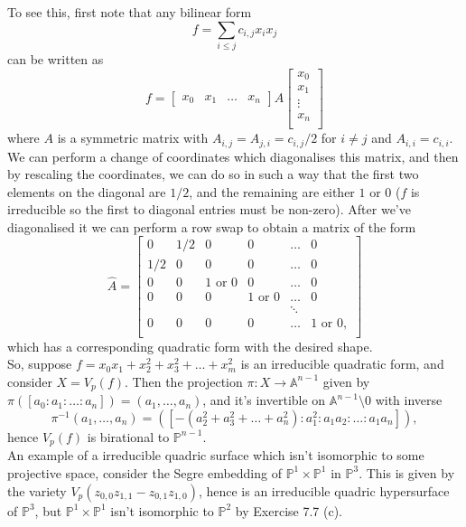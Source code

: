 \documentclass{article}
\theoremstyle{definition}
\renewcommand{\P}{\mathbb{P}}
\newcommand{\A}{\mathbb{A}}
\renewcommand{\AA}[1]{\A^{#1}}
\newcommand{\PP}[1]{\P^{#1}}
\begin{document}
To see this, first note that any bilinear form
\[
	f = \sum_{i \leq j} c_{i, j} x_i x_j
\]
can be written as 
\[
	f 
	=
	\begin{bmatrix}
		x_0 & x_1 & \ldots & x_n 
	\end{bmatrix}
	A
	\begin{bmatrix}
		x_0 \\
		x_1 \\
		\vdots \\
		x_n \\
	\end{bmatrix}
\] 
where $A$ is a symmetric matrix with $A_{i,j} = A_{j, i} = c_{i,j}/2$ for $i
\not = j$ and $A_{i, i} = c_{i, i}$. We can perform a change of coordinates
which diagonalises this matrix, and then by rescaling the coordinates, we can
do so in such a way that the first two elements on the diagonal are $1/2$, and
the remaining are either $1$ or $0$ ($f$ is irreducible so the first to
diagonal entries must be non-zero). After we've diagonalised it we can perform
a row swap to obtain a matrix of the form
\[
	\hat{A}
	=
	\begin{bmatrix}
		0 & 1/2 & 0 & 0 & \ldots & 0 \\
		1/2 & 0 & 0 & 0 &\ldots & 0 \\
		0 & 0 & 1 \text{ or } 0 & 0 & \ldots & 0 \\
		0 & 0 & 0 & 1 \text{ or } 0 & \ldots & 0 \\
		 &  &  &  & \ddots & \\
		0 & 0 & 0 & 0 & \ldots & 1 \text{ or } 0, \\
	\end{bmatrix}
\] 
which has a corresponding quadratic form with the desired shape. \\

So, suppose $f = x_0x_1 + x_2^2 + x_3^2 + \ldots + x_m^2$ is an irreducible
quadratic form, and consider $X = V_p(f)$. Then the projection $\pi : X \to
\AA{n - 1}$ given by $\pi([a_0:a_1:\ldots:a_n]) = (a_1,\ldots,a_n)$, and it's
invertible on $\AA{n - 1} \setminus 0$ with inverse
\[
	\pi^{-1}(a_1, \ldots, a_n) 
	=
	([-(a_2^{2} + a_3^{2} + \ldots + a_n^{2}) : a_1^{2} : a_1a_2 : \ldots : a_1 a_n]),
\]
hence $V_p(f)$ is birational to $\PP{n - 1}$. \\

An example of a irreducible quadric surface which isn't isomorphic to some
projective space, consider the Segre embedding of $\PP{1} \times \PP{1}$ in
$\PP{3}$. This is given by the variety $V_p(z_{0, 0}z_{1,1} - z_{0, 1}z_{1,
0})$, hence is an irreducible quadric hypersurface of $\PP{3}$, but $\PP{1}
\times \PP{1}$ isn't isomorphic to $\PP{2}$ by Exercise 7.7 (c).
\end{document}
